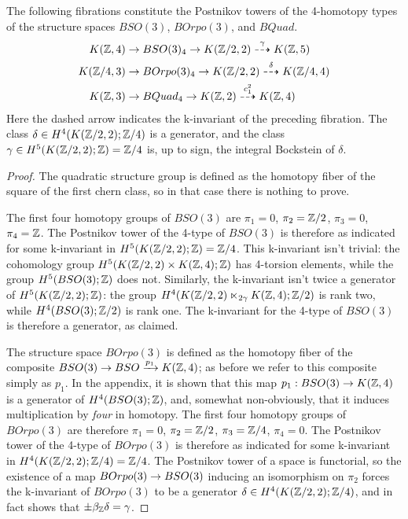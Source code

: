 \documentclass{amsart}
\begin{document}
\begin{proposition}
The following fibrations constitute the Postnikov towers of the 4-homotopy types of the structure spaces $BSO(3)$, $BOrpo(3)$, and $BQuad$.
\begin{align}
K(\mathbb Z,4) \rightarrow & \; BSO(3)_4 \rightarrow K(\mathbb Z/2,2) \overset{\gamma}{\dashrightarrow} K(\mathbb Z,5) \nonumber \\
K(\mathbb Z/4,3) \rightarrow & \; BOrpo(3)_4 \rightarrow K(\mathbb Z/2,2) \overset{\delta}{\dashrightarrow} K(\mathbb Z/4,4) \nonumber \\
K(\mathbb Z,3) \rightarrow & \; BQuad_4 \rightarrow K(\mathbb Z,2) \overset{c_1^2}{\dashrightarrow} K(\mathbb Z,4) \nonumber
\end{align}
\nid Here the dashed arrow indicates the k-invariant of the preceding fibration.  The class $\delta \in H^4(K(\mathbb Z/2,2);\mathbb Z/4)$ is a generator, and the class $\gamma \in H^5(K(\mathbb Z/2,2);\mathbb Z) = \mathbb Z/4$ is, up to sign, the integral Bockstein of $\delta$. %
\end{proposition}

\begin{proof}
The quadratic structure group is defined as the homotopy fiber of the square of the first chern class, so in that case there is nothing to prove.

The first four homotopy groups of $BSO(3)$ are $\pi_1 = 0$, $\pi_2 = \mathbb Z/2$, $\pi_3 = 0$, $\pi_4 = \mathbb Z$.  The Postnikov tower of the 4-type of $BSO(3)$ is therefore as indicated for some k-invariant in $H^5(K(\mathbb Z/2,2);\mathbb Z) = \mathbb Z/4$.  This k-invariant isn't trivial: the cohomology group $H^5(K(\mathbb Z/2,2) \times K(\mathbb Z,4);\mathbb Z)$ has 4-torsion elements, while the group $H^5(BSO(3);\mathbb Z)$ does not.  Similarly, the k-invariant isn't twice a generator of $H^5(K(\mathbb Z/2,2);\mathbb Z)$: the group $H^4(K(\mathbb Z/2,2) \ltimes_{2\gamma} K(\mathbb Z,4);\mathbb Z/2)$ is rank two, while $H^4(BSO(3);\mathbb Z/2)$ is rank one.  The k-invariant for the 4-type of $BSO(3)$ is therefore a generator, as claimed.

The structure space $BOrpo(3)$ is defined as the homotopy fiber of the composite $BSO(3) \rightarrow BSO \xrightarrow{p_1} K(\mathbb Z,4)$; as before we refer to this composite simply as $p_1$.  In the appendix, it is shown that this map $p_1: BSO(3) \rightarrow K(\mathbb Z,4)$ is a generator of $H^4(BSO(3);\mathbb Z)$, and, somewhat non-obviously, that it induces multiplication by \emph{four} in homotopy.  The first four homotopy groups of $BOrpo(3)$ are therefore $\pi_1 = 0$, $\pi_2 = \mathbb Z/2$, $\pi_3 = \mathbb Z/4$, $\pi_4 = 0$.  The Postnikov tower of the 4-type of $BOrpo(3)$ is therefore as indicated for some k-invariant in $H^4(K(\mathbb Z/2,2);\mathbb Z/4) = \mathbb Z/4$.  The Postnikov tower of a space is functorial, so the existence of a map $BOrpo(3) \rightarrow BSO(3)$ inducing an isomorphism on $\pi_2$ forces the k-invariant of $BOrpo(3)$ to be a generator $\delta \in H^4(K(\mathbb Z/2,2);\mathbb Z/4)$, and in fact shows that $\pm \beta_{\mathbb Z} \delta = \gamma$. 
\end{proof}
\end{document}

